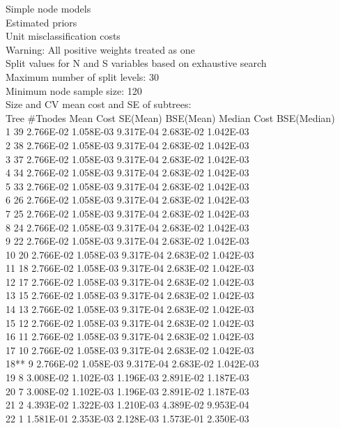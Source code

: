 \documentclass[12pt]{article}
\begin{document}
 Simple node models\\
 Estimated priors\\
 Unit misclassification costs\\
 Warning: All positive weights treated as one\\
 Split values for N and S variables based on exhaustive search\\
 Maximum number of split levels: 30\\
 Minimum node sample size: 120\\
 Size and CV mean cost and SE of subtrees:\\
  Tree   \#Tnodes  Mean Cost   SE(Mean)   BSE(Mean)  Median Cost  BSE(Median)\\
    1       39   2.766E-02   1.058E-03   9.317E-04   2.683E-02   1.042E-03\\
    2       38   2.766E-02   1.058E-03   9.317E-04   2.683E-02   1.042E-03\\
    3       37   2.766E-02   1.058E-03   9.317E-04   2.683E-02   1.042E-03\\
    4       34   2.766E-02   1.058E-03   9.317E-04   2.683E-02   1.042E-03\\
    5       33   2.766E-02   1.058E-03   9.317E-04   2.683E-02   1.042E-03\\
    6       26   2.766E-02   1.058E-03   9.317E-04   2.683E-02   1.042E-03\\
    7       25   2.766E-02   1.058E-03   9.317E-04   2.683E-02   1.042E-03\\
    8       24   2.766E-02   1.058E-03   9.317E-04   2.683E-02   1.042E-03\\
    9       22   2.766E-02   1.058E-03   9.317E-04   2.683E-02   1.042E-03\\
   10       20   2.766E-02   1.058E-03   9.317E-04   2.683E-02   1.042E-03\\
   11       18   2.766E-02   1.058E-03   9.317E-04   2.683E-02   1.042E-03\\
   12       17   2.766E-02   1.058E-03   9.317E-04   2.683E-02   1.042E-03\\
   13       15   2.766E-02   1.058E-03   9.317E-04   2.683E-02   1.042E-03\\
   14       13   2.766E-02   1.058E-03   9.317E-04   2.683E-02   1.042E-03\\
   15       12   2.766E-02   1.058E-03   9.317E-04   2.683E-02   1.042E-03\\
   16       11   2.766E-02   1.058E-03   9.317E-04   2.683E-02   1.042E-03\\
   17       10   2.766E-02   1.058E-03   9.317E-04   2.683E-02   1.042E-03\\
   18**      9   2.766E-02   1.058E-03   9.317E-04   2.683E-02   1.042E-03\\
   19        8   3.008E-02   1.102E-03   1.196E-03   2.891E-02   1.187E-03\\
   20        7   3.008E-02   1.102E-03   1.196E-03   2.891E-02   1.187E-03\\
   21        2   4.393E-02   1.322E-03   1.210E-03   4.389E-02   9.953E-04\\
   22        1   1.581E-01   2.353E-03   2.128E-03   1.573E-01   2.350E-03\\
  
\end{document}
